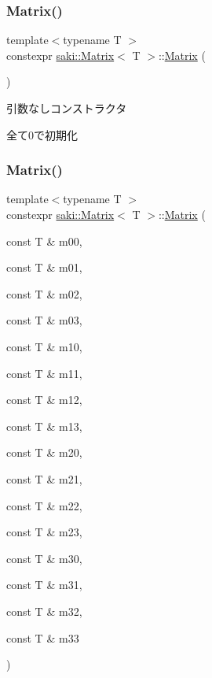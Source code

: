 \subsubsection{\texorpdfstring{Matrix()}{Matrix()}\hspace{0.1cm}{\footnotesize\ttfamily [1/5]}}
{\footnotesize\ttfamily template$<$typename T $>$ \\
constexpr \mbox{\hyperlink{classsaki_1_1_matrix}{saki\+::\+Matrix}}$<$ T $>$\+::\mbox{\hyperlink{classsaki_1_1_matrix}{Matrix}} (\begin{DoxyParamCaption}{ }\end{DoxyParamCaption})\hspace{0.3cm}{\ttfamily [inline]}}



引数なしコンストラクタ 

全て0で初期化 \mbox{\label{classsaki_1_1_matrix_ad4f497bd4ba2b7de464afea4436d9a51}} 
\subsubsection{\texorpdfstring{Matrix()}{Matrix()}\hspace{0.1cm}{\footnotesize\ttfamily [2/5]}}
{\footnotesize\ttfamily template$<$typename T $>$ \\
constexpr \mbox{\hyperlink{classsaki_1_1_matrix}{saki\+::\+Matrix}}$<$ T $>$\+::\mbox{\hyperlink{classsaki_1_1_matrix}{Matrix}} (\begin{DoxyParamCaption}\item[{const T \&}]{m00,  }\item[{const T \&}]{m01,  }\item[{const T \&}]{m02,  }\item[{const T \&}]{m03,  }\item[{const T \&}]{m10,  }\item[{const T \&}]{m11,  }\item[{const T \&}]{m12,  }\item[{const T \&}]{m13,  }\item[{const T \&}]{m20,  }\item[{const T \&}]{m21,  }\item[{const T \&}]{m22,  }\item[{const T \&}]{m23,  }\item[{const T \&}]{m30,  }\item[{const T \&}]{m31,  }\item[{const T \&}]{m32,  }\item[{const T \&}]{m33 }\end{DoxyParamCaption})\hspace{0.3cm}{\ttfamily [inline]}}



